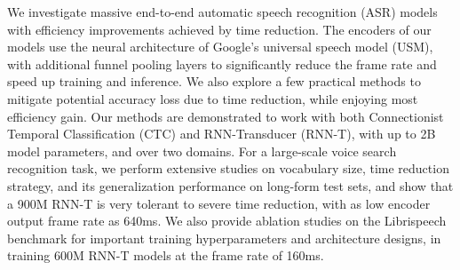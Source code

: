 We investigate massive end-to-end automatic speech recognition (ASR) models with efficiency improvements achieved by time reduction. The encoders of our models use the neural architecture of Google's universal speech model (USM), with additional funnel pooling layers to significantly reduce the frame rate and speed up training and inference. We also explore a few practical methods to mitigate potential accuracy loss due to time reduction, while enjoying most efficiency gain. Our methods are demonstrated to work with both Connectionist Temporal Classification (CTC) and RNN-Transducer (RNN-T), with up to 2B model parameters, and over two domains. For a large-scale voice search recognition task, we perform extensive studies on vocabulary size, time reduction strategy, and its generalization performance on long-form test sets, and show that a 900M RNN-T is very tolerant to severe time reduction, with as low encoder output frame rate as 640ms. We also provide ablation studies on the Librispeech benchmark for important training hyperparameters and architecture designs, in training 600M RNN-T models at the frame rate of 160ms.